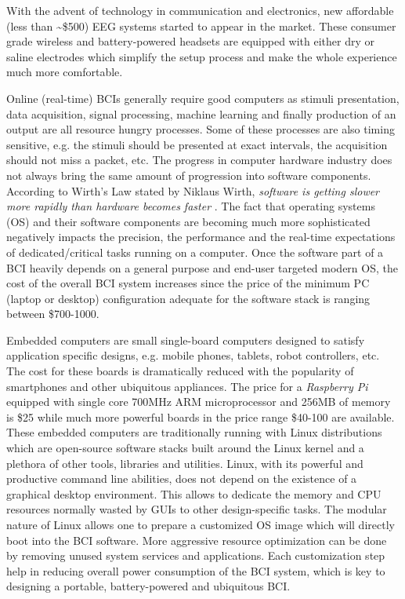 \documentclass[12pt]{article}
\numberwithin{equation}{section}
\numberwithin{figure}{section}
\numberwithin{table}{section}
\begin{document}
\par{
    With the advent of technology in communication and electronics, new affordable (less than \textasciitilde\$500)
    EEG systems started to appear in the market. These consumer grade wireless and
    battery-powered headsets are equipped with either dry or saline
    electrodes which simplify the setup process and make the whole experience
    much more comfortable.
}
\par{
    Online (real-time) BCIs generally require good computers as
    stimuli presentation, data acquisition, signal processing, machine
    learning and finally production of an output are all resource hungry
    processes. Some of these processes are also timing sensitive, e.g.
    the stimuli should be presented at exact intervals, the acquisition
    should not miss a packet, etc.
    The progress in computer hardware industry does not always bring the
    same amount of progression into software components. According to Wirth's
    Law stated by Niklaus Wirth, \emph{software is getting slower more
    rapidly than hardware becomes faster} \citep{wirth_plea_1995}.
    The fact that operating systems (OS) and their software components are
    becoming much more sophisticated negatively impacts the precision, the performance
    and the real-time expectations of dedicated/critical tasks running on a computer.
    Once the software part of a BCI heavily depends on a general purpose and end-user targeted
    modern OS, the cost of the overall BCI system increases since the price of the minimum
    PC (laptop or desktop) configuration adequate for the software stack is ranging between
    \$700-1000.
}

\par{
    Embedded computers are small single-board computers designed to satisfy
    application specific designs, e.g. mobile phones, tablets, robot controllers, etc.
    The cost for these boards is dramatically reduced with the popularity of
    smartphones and other ubiquitous appliances. The price for a \emph{Raspberry Pi} equipped with
    single core 700MHz ARM microprocessor and 256MB of memory is \$25 while much more
    powerful boards in the price range \$40-100 are available.
    These embedded computers are traditionally running with Linux distributions
    which are open-source software stacks built around the Linux kernel
    and a plethora of other tools, libraries and utilities. Linux, with its
    powerful and productive command line abilities, does not depend on the
    existence of a graphical desktop environment. This allows to dedicate
    the memory and CPU resources normally wasted by GUIs to other design-specific
    tasks. The modular nature of Linux allows one to prepare a customized
    OS image which will directly boot into the BCI software. More aggressive resource
    optimization can be done by removing unused system services and applications.
    Each customization step help in reducing overall power consumption of the
    BCI system, which is key to designing a portable, battery-powered and ubiquitous
    BCI.
}
\end{document}
